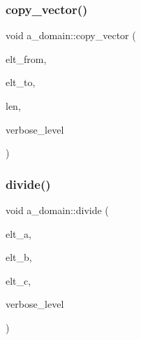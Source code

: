 \mbox{\label{classa__domain_adc51883ec234c73edbbc047a0a3e2f6c}} 
\subsubsection{\texorpdfstring{copy\+\_\+vector()}{copy\_vector()}}
{\footnotesize\ttfamily void a\+\_\+domain\+::copy\+\_\+vector (\begin{DoxyParamCaption}\item[{\mbox{\hyperlink{galois_8h_a09fddde158a3a20bd2dcadb609de11dc}{I\+NT}} $\ast$}]{elt\+\_\+from,  }\item[{\mbox{\hyperlink{galois_8h_a09fddde158a3a20bd2dcadb609de11dc}{I\+NT}} $\ast$}]{elt\+\_\+to,  }\item[{\mbox{\hyperlink{galois_8h_a09fddde158a3a20bd2dcadb609de11dc}{I\+NT}}}]{len,  }\item[{\mbox{\hyperlink{galois_8h_a09fddde158a3a20bd2dcadb609de11dc}{I\+NT}}}]{verbose\+\_\+level }\end{DoxyParamCaption})}

\mbox{\label{classa__domain_a5e7a6749b6877ab116ee1fa86f7bc7a1}} 
\subsubsection{\texorpdfstring{divide()}{divide()}}
{\footnotesize\ttfamily void a\+\_\+domain\+::divide (\begin{DoxyParamCaption}\item[{\mbox{\hyperlink{galois_8h_a09fddde158a3a20bd2dcadb609de11dc}{I\+NT}} $\ast$}]{elt\+\_\+a,  }\item[{\mbox{\hyperlink{galois_8h_a09fddde158a3a20bd2dcadb609de11dc}{I\+NT}} $\ast$}]{elt\+\_\+b,  }\item[{\mbox{\hyperlink{galois_8h_a09fddde158a3a20bd2dcadb609de11dc}{I\+NT}} $\ast$}]{elt\+\_\+c,  }\item[{\mbox{\hyperlink{galois_8h_a09fddde158a3a20bd2dcadb609de11dc}{I\+NT}}}]{verbose\+\_\+level }\end{DoxyParamCaption})}

\mbox{\label{classa__domain_a24997924a25569b58e1d2fa8ba4391bc}} 
